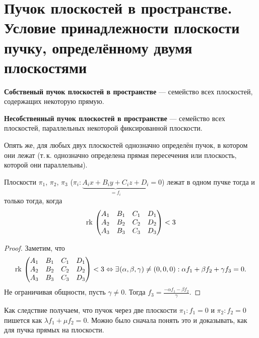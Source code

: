 \section{Пучок плоскостей в пространстве. Условие принадлежности плоскости пучку, определённому двумя плоскостями}

\begin{definition}
    \textbf{Собственый пучок плоскостей в пространстве} --- семейство всех плоскостей, содержащих некоторую прямую.
\end{definition}

\begin{definition}
    \textbf{Несобственный пучок плоскостей в пространстве} --- семейство всех плоскостей, параллельных некоторой фиксированной плоскости.
\end{definition}

Опять же, для любых двух плоскостей однозначно определён пучок, в котором они лежат (т.\,к. однозначно определена прямая пересечения или плоскость, которой они параллельны).

\begin{statement}
    Плоскости $\pi_1$, $\pi_2$, $\pi_3$ ($\pi_i: \underbrace{A_ix + B_iy + C_iz + D_i}_{{} = f_i} = 0$) лежат в одном пучке тогда и только тогда, когда
    $$\mathrm{rk}\,
    \begin{pmatrix}
        A_1 & B_1 & C_1 & D_1\\
        A_2 & B_2 & C_2 & D_2\\
        A_3 & B_3 & C_3 & D_3
    \end{pmatrix} < 3
    $$
\end{statement}

\begin{proof}
    Заметим, что 
    $$\mathrm{rk}\,
    \begin{pmatrix}
        A_1 & B_1 & C_1 & D_1\\
        A_2 & B_2 & C_2 & D_2\\
        A_3 & B_3 & C_3 & D_3
    \end{pmatrix} < 3 \Leftrightarrow \exists\!\:(\alpha, \beta, \gamma) \ne (0, 0, 0):\alpha f_1 + \beta f_2 + \gamma f_3 = 0.
    $$
    Не ограничивая общности, пусть $\gamma \ne 0$. Тогда $\displaystyle f_3 = \frac{-\alpha f_1 - \beta f_2}{\gamma}$. 
\end{proof}

\begin{remark}
    Как следствие получаем, что пучок через две плоскости $\pi_1: f_1 = 0$ и $\pi_2: f_2 = 0$ пишется как
    $\lambda f_1 + \mu f_2 = 0$. Можно было сначала понять это и доказывать, как для пучка прямых на плоскости.
\end{remark}


